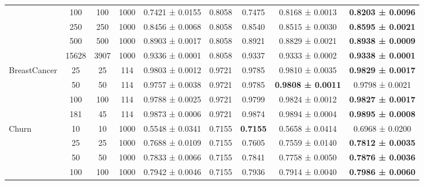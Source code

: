 \begin{table}
{\begin{tabular}[H]{@{}lcccccccc@{}}
                              & 100   & 100  & 1000 & 0.7421 ± 0.0155      & 0.8058               & 0.7475          & 0.8168 ± 0.0013          & \textbf{0.8203 ± 0.0096} \\
                              & 250   & 250  & 1000 & 0.8456 ± 0.0068      & 0.8058               & 0.8540          & 0.8515 ± 0.0030          & \textbf{0.8595 ± 0.0021} \\
                              & 500   & 500  & 1000 & 0.8903 ± 0.0017      & 0.8058               & 0.8921          & 0.8829 ± 0.0021          & \textbf{0.8938 ± 0.0009} \\
                              & 15628 & 3907 & 1000 & 0.9336 ± 0.0001      & 0.8058               & 0.9337          & 0.9333 ± 0.0002          & \textbf{0.9338 ± 0.0001} \\
                              \midrule
\multirow{4}{*}{BreastCancer} & 25    & 25   & 114  & 0.9803 ± 0.0012      & 0.9721               & 0.9785          & 0.9810 ± 0.0035          & \textbf{0.9829 ± 0.0017} \\
                              & 50    & 50   & 114  & 0.9757 ± 0.0038      & 0.9721               & 0.9785          & \textbf{0.9808 ± 0.0011} & 0.9798 ± 0.0021          \\
                              & 100   & 100  & 114  & 0.9788 ± 0.0025      & 0.9721               & 0.9799          & 0.9824 ± 0.0012          & \textbf{0.9827 ± 0.0017} \\
                              & 181   & 45   & 114  & 0.9873 ± 0.0006      & 0.9721               & 0.9874          & 0.9894 ± 0.0004          & \textbf{0.9895 ± 0.0008} \\
                              \midrule
\multirow{7}{*}{Churn}        & 10    & 10   & 1000 & 0.5548 ± 0.0341      & 0.7155               & \textbf{0.7155} & 0.5658 ± 0.0414          & 0.6968 ± 0.0200          \\
                              & 25    & 25   & 1000 & 0.7688 ± 0.0109      & 0.7155               & 0.7605          & 0.7559 ± 0.0140          & \textbf{0.7812 ± 0.0035} \\
                              & 50    & 50   & 1000 & 0.7833 ± 0.0066      & 0.7155               & 0.7841          & 0.7758 ± 0.0050          & \textbf{0.7876 ± 0.0036} \\
                              & 100   & 100  & 1000 & 0.7942 ± 0.0046      & 0.7155               & 0.7936          & 0.7914 ± 0.0040          & \textbf{0.7986 ± 0.0060} \\

\end{tabular}}
\end{table}
